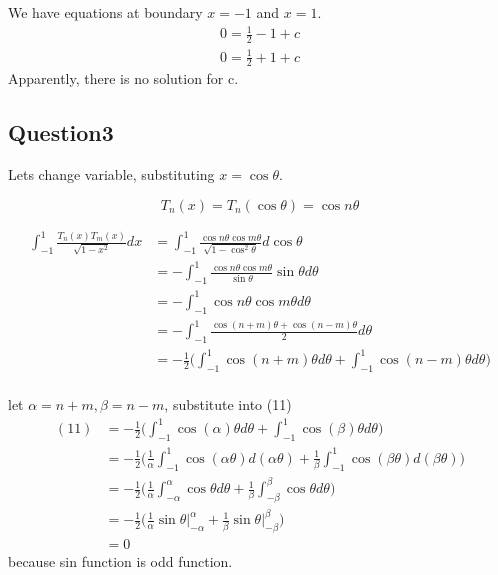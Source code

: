 \documentclass{article}
\begin{document}
We have equations at boundary $x = -1$ and $x = 1$.
\begin{equation}
  \begin{split}
    0 = \frac{1}{2} - 1 + c \\
    0 = \frac{1}{2} + 1 + c
  \end{split}
\end{equation}
Apparently, there is no solution for c.

\subsection*{Question3}
Lets change variable, substituting $ x = \cos \theta$.

$$T_n (x) = T_n (\cos{\theta}) = \cos n \theta$$

\begin{equation}
  \begin{split}
    \int^{1}_{-1} \frac{T_n(x) T_m(x)}{\sqrt{1-x^2}} dx
    &= \int^{1}_{-1} \frac{\cos n \theta \cos m \theta}{\sqrt{1-\cos^2 \theta}} d \cos \theta \\
    &= - \int^{1}_{-1} \frac{\cos n \theta \cos m \theta}{\sin \theta} \sin \theta d\theta\\
    &= - \int^{1}_{-1} \cos n \theta \cos m \theta d\theta \\
    &= - \int^{1}_{-1} \frac{\cos (n+m)\theta + \cos (n-m)\theta}{2} d\theta \\
    &= - \frac{1}{2} \bigg(\int^{1}_{-1} \cos (n+m)\theta d\theta + \int^{1}_{-1}  \cos (n-m)\theta  d\theta \bigg) \\
  \end{split}
\end{equation}

let $\alpha = n+m , \beta = n-m$, substitute into (11)
\begin{equation}
  \begin{split}
   (11)&=- \frac{1}{2} \bigg(\int^{1}_{-1} \cos (\alpha)\theta d\theta + \int^{1}_{-1}  \cos (\beta)\theta  d\theta \bigg) \\
   &= - \frac{1}{2} \bigg(\frac{1}{\alpha} \int^{1}_{-1} \cos (\alpha\theta) d (\alpha \theta) + \frac{1}{\beta}\int^{1}_{-1} \cos (\beta\theta)  d(\beta\theta) \bigg) \\
   &= - \frac{1}{2} \bigg(\frac{1}{\alpha} \int^{\alpha}_{-\alpha} \cos \theta d \theta + \frac{1}{\beta}\int^{\beta}_{-\beta} \cos \theta  d\theta \bigg) \\
   &= - \frac{1}{2} \bigg(\frac{1}{\alpha} \sin\theta \vert^{\alpha}_{-\alpha}  + \frac{1}{\beta} \sin\theta \vert^{\beta}_{-\beta} \bigg) \\
   &= 0
  \end{split}
\end{equation}
because sin function is odd function.
\end{document}

